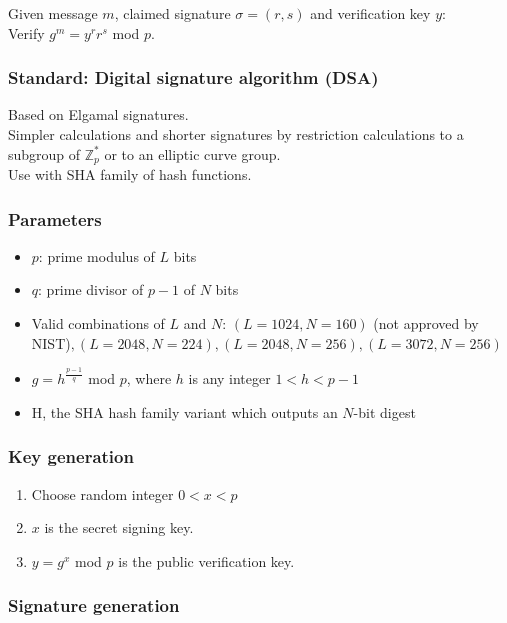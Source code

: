 \documentclass{article}
\begin{document}
Given message $m$, claimed signature $\sigma = (r,s)$ and verification key $y$:\\
Verify $g^m = y^r r^s$ mod $p$.

\subsubsection{Standard: Digital signature algorithm (DSA)}

Based on Elgamal signatures.\\
Simpler calculations and shorter signatures by restriction calculations to a subgroup of $\mathbb{Z}_p^*$ or to an elliptic curve group.\\
Use with SHA family of hash functions.

\subsubsection{Parameters}

\begin{itemize}
    \item $p$: prime modulus of $L$ bits
    \item $q$: prime divisor of $p-1$ of $N$ bits
    \item Valid combinations of $L$ and $N$: $(L=1024, N=160)$ (not approved by NIST)$, (L=2048, N=224), (L=2048, N=256), (L=3072, N=256)$
    \item $g = h^{\frac{p-1}{q}}$ mod $p$, where $h$ is any integer $1 < h < p-1$
    \item H, the SHA hash family variant which outputs an $N$-bit digest
\end{itemize}

\subsubsection{Key generation}

\begin{enumerate}
    \item Choose random integer $0<x<p$
    \item $x$ is the secret signing key.
    \item $y = g^x$ mod $p$ is the public verification key.
\end{enumerate}

\subsubsection{Signature generation}
\end{document}
